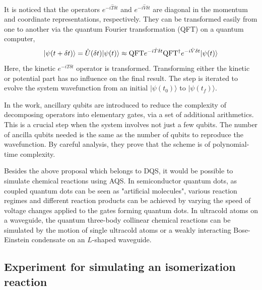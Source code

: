 \documentclass[8.5pt,twoside,twocolumn]{article}
\begin{document}
It is noticed that the operators $e^{ - i \hat{T} \delta t}$
and $e^{ - i \hat{V} \delta t}$
are diagonal in the momentum and coordinate representations, respectively.
They can be transformed easily from one to another
via the quantum Fourier transformation (QFT)\cite{QFT_1}
on a quantum computer,
\[|\psi (t+\delta t)\rangle  = \hat U(\delta t)|\psi (t)\rangle
  \approx {\rm{QFT}}{e^{-i\hat T\delta t}}
  {\rm{QF}}{{\rm{T}}^{\rm{\dag}}}{e^{-i\hat V\delta t}}|\psi (t)\rangle \]
Here, the kinetic $e^{ - i \hat{T} \delta t}$ operator is transformed.
Transforming either the kinetic or
potential part has no influence on the final result.
The step is iterated to evolve the system wavefunction from an initial
$|\psi(t_0) \rangle$ to $|\psi(t_f) \rangle$.

In the work,\cite{Polynomial_time_algorithm}
ancillary qubits are introduced
to reduce the complexity of decomposing operators
into elementary gates,
via a set of additional arithmetics.
This is a crucial step when the system involves
not just a few qubits.
The number of ancilla qubits needed is the same as
the number of qubits to reproduce the wavefunction.
By careful analysis, they prove that the scheme is
of polynomial-time complexity.

Besides the above proposal which belongs to DQS, it would be possible to simulate chemical reactions using AQS. In semiconductor quantum dots,\cite{AQS_3} as coupled quantum dots can be seen as "artificial molecules", various reaction regimes and different reaction products can be achieved by varying the speed of voltage changes applied to the gates forming quantum dots. In ultracold atoms on a waveguide,\cite{ultracold} the quantum three-body collinear chemical reactions can be simulated by the motion of single ultracold atoms or a weakly interacting Bose-Einstein condensate on an $L$-shaped waveguide.

\subsection{Experiment for simulating an isomerization reaction}
\end{document}
